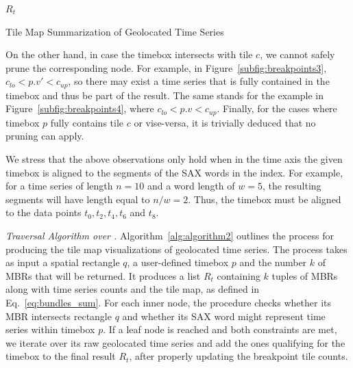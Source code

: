 \begin{algorithm}[ht!]
\begin{footnotesize}
{    \KwRet $R_t$ \\
  }
  \vspace{6pt}
  \end{footnotesize}
  \caption{Tile Map Summarization of Geolocated Time Series}
  \label{alg:algorithm2}
\end{algorithm}

On the other hand, in case the timebox intersects with tile $c$, we cannot safely prune the corresponding node. For example, in Figure~\ref{subfig:breakpoints3}, $c_{lo} < p.v' < c_{up}$, so there may exist a time series that is fully contained in the timebox and thus be part of the result. The same stands for the example in Figure~\ref{subfig:breakpoints4}, where  $c_{lo} < p.v < c_{up}$. Finally, for the cases where timebox $p$ fully contains tile $c$ or vise-versa, it is trivially deduced that no pruning can apply.

We stress that the above observations only hold when in the time axis the given timebox is aligned to the segments of the SAX words in the index. For example, for a time series of length $n=10$ and a word length of $w=5$, the resulting segments will have length equal to $n/w=2$. Thus, the timebox must be aligned to the data points $t_0, t_2, t_4, t_6$ and $t_8$.

\emph{Traversal Algorithm over \hisax.} Algorithm~\ref{alg:algorithm2} outlines the process for producing the tile map visualizations of geolocated time series. The process takes as input a spatial rectangle $q$, a user-defined timebox $p$ and the number $k$ of MBRs that will be returned. It produces a list $R_t$ containing $k$ tuples of MBRs along with time series counts and the tile map, as defined in Eq.~\ref{eq:bundles_sum}. For each inner node, the procedure checks whether its MBR intersects rectangle $q$ and whether its SAX word might represent time series within timebox $p$. If a leaf node is reached and both constraints are met, we iterate over its raw geolocated time series and add the ones qualifying for the timebox to the final result $R_t$, after properly updating the breakpoint tile counts.

